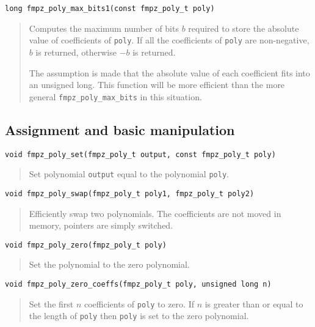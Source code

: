 \documentclass[a4paper,10pt]{article}
\newcommand{\code}{\lstinline}
\begin{document}
\begin{lstlisting}
long fmpz_poly_max_bits1(const fmpz_poly_t poly)
\end{lstlisting}
\begin{quote}
Computes the maximum number of bits $b$ required to store the absolute value of coefficients of \code{poly}. If all the coefficients of \code{poly} are non-negative, $b$ is returned, otherwise $-b$ is returned. 

The assumption is made that the absolute value of each coefficient fits into an unsigned long. This function will be more efficient than the more general \code{fmpz_poly_max_bits} in this situation.
\end{quote}


\subsection{Assignment and basic manipulation}

\begin{lstlisting}
void fmpz_poly_set(fmpz_poly_t output, const fmpz_poly_t poly)
\end{lstlisting}
\begin{quote}
Set polynomial \code{output} equal to the polynomial \code{poly}.
\end{quote}

\begin{lstlisting}
void fmpz_poly_swap(fmpz_poly_t poly1, fmpz_poly_t poly2)
\end{lstlisting}
\begin{quote}
Efficiently swap two polynomials. The coefficients are not moved in memory, pointers are simply switched. \end{quote}

\begin{lstlisting}
void fmpz_poly_zero(fmpz_poly_t poly) 
\end{lstlisting}
\begin{quote}
Set the polynomial to the zero polynomial.
\end{quote}

\begin{lstlisting}
void fmpz_poly_zero_coeffs(fmpz_poly_t poly, unsigned long n) 
\end{lstlisting}
\begin{quote}
Set the first $n$ coefficients of \code{poly} to zero. If $n$ is greater than or equal to the length of \code{poly} then \code{poly} is set to the zero polynomial.
\end{quote}
\end{document}
